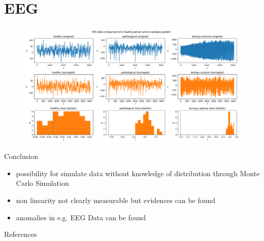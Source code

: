 \section{EEG}
\begin{frame}
  \frametitle{\insertsectionhead}
  \framesubtitle{\insertsubsectionhead}
  \begin{figure}
    \centering
    \includegraphics[height=0.8\textheight]{figs/EEG.png}
  \end{figure}
\end{frame}


\begin{frame}{Conclusion}
  \begin{itemize}
    \item possibility for simulate data without knowledge of distribution through Monte Carlo Simulation
    \item non linearity not clearly measurable but evidences can be found
    \item anomalies in e.g. EEG Data can be found 
  \end{itemize}
\end{frame}

\appendix

\begin{frame}[shrink=25]{References}
  \nocite{Theiler1992TestingFN}
  
  
  \nocite{Kugiumtzis1999-qt}
\end{frame}
